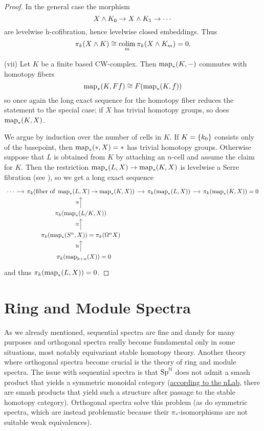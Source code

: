 \begin{proof}
In the general case the morphism
\[X\wedge K_0\to X\wedge K_1\to\cdots\]
are levelwise h-cofibration, hence levelwise closed embeddings. Thus
\[\pi_k(X\wedge K)\cong\operatorname*{colim}_m\pi_k(X\wedge K_m)=0.\]

(vii) Let $K$ be a finite based CW-complex. Then $\operatorname{map}_*(K,-)$ commutes with homotopy fibers
\[\operatorname{map}_*(K,Ff)\cong F(\operatorname{map}_*(K,f))\]
so once again the long exact sequence for the homotopy fiber reduces the\vspace{-0.2ex} statement to the special case: if $X$ has trivial homotopy groups, so does $\operatorname{map}_*(K,X)$.

We argue by induction over the number of cells in $K$. If $K=\{k_0\}$ consists only of the basepoint, then $\operatorname{map}_*(*,X)=*$ has trivial homotopy groups.
Otherwise suppose that $L$ is obtained from $K$ by attaching an $n$-cell and assume the claim for $K$. Then the restriction $\operatorname{map}_*(L,X)\to\operatorname{map}_*(K,X)$ is levelwise a Serre fibration (see \cite[theorem III.7]{AT1Notes}), so we get a long exact sequence
{\small\[
\begin{tikzcd}[column sep=small]
\cdots \arrow[r] & {\pi_k(\text{fiber of } \map_*(L,X) \to \map_*(K,X))} \arrow[r] & {\pi_k(\map_*(L,X))} \arrow[r] & {\pi_k(\map_*(K,X))=0} 
\\ & {\pi_k(\map_*(L/K, X))} \arrow[u, "\cong"] & &
\\ & {\pi_k(\map_*(S^n, X))}=\pi_k(\Omega^n X) \arrow[u, "\cong"]
\\ & \quad\pi_k(\map_{k+n}(X)) = 0 \arrow[u, "\cong"]
\end{tikzcd}
\]}
and thus $\pi_k(\operatorname{map}_*(L,X))=0$.
\end{proof}

\section{Ring and Module Spectra}

As we already mentioned, sequential spectra are fine and dandy for many purposes and orthogonal spectra really become fundamental only in some situations, most notably equivariant stable homotopy theory. Another theory where orthogonal spectra become crucial is the theory of ring and module spectra. The issue with sequential spectra is that ${\normalfont\textup{Sp}}^{\mathbb N}$ does not admit a smash product that yields a symmetric monoidal category (\href{https://ncatlab.org/nlab/show/smash+product+of+spectra}{according to the nLab}, there are smash products that yield such a structure  after passage to the stable homotopy category). Orthogonal spectra solve this problem (as do symmetric spectra, which are instead problematic because their $\pi_*$-isomorphisms are not suitable weak equivalences).

